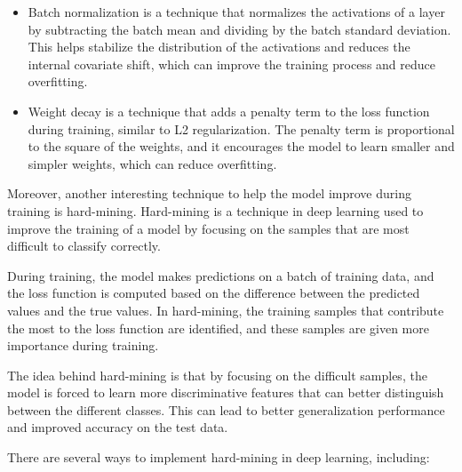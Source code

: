 \begin{itemize}
	\item Batch normalization is a technique that normalizes the activations of a layer by subtracting the batch mean and dividing by the batch standard deviation. This helps stabilize the distribution of the activations and reduces the internal covariate shift, which can improve the training process and reduce overfitting.
	
	\item Weight decay is a technique that adds a penalty term to the loss function during training, similar to L2 regularization. The penalty term is proportional to the square of the weights, and it encourages the model to learn smaller and simpler weights, which can reduce overfitting.
	
\end{itemize}

Moreover, another interesting technique to help the model improve during training is hard-mining. Hard-mining is a technique in deep learning used to improve the training of a model by focusing on the samples that are most difficult to classify correctly.

During training, the model makes predictions on a batch of training data, and the loss function is computed based on the difference between the predicted values and the true values. In hard-mining, the training samples that contribute the most to the loss function are identified, and these samples are given more importance during training.

The idea behind hard-mining is that by focusing on the difficult samples, the model is forced to learn more discriminative features that can better distinguish between the different classes. This can lead to better generalization performance and improved accuracy on the test data.

There are several ways to implement hard-mining in deep learning, including:


